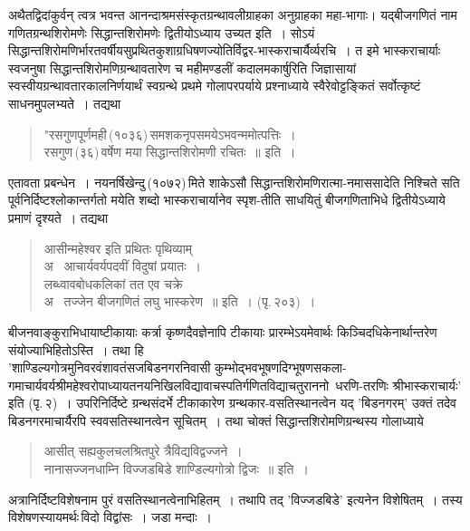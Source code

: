 \documentclass[11pt, openany]{book}
\begin{document}
\begin{sloppypar}
अथैतद्विदांकुर्वन् त्वत्र भवन्त आनन्दाश्रमसंस्कृतग्रन्थावलीग्राहका अनुग्राहका महा-भागाः\;। यद्बीजगणितं नाम गणितग्रन्थशिरोमणेः सिद्धान्तशिरोमणेः द्वितीयोऽध्याय उच्यत इति~। सोऽयं सिद्धान्तशिरोमणिर्भारतवर्षीयसुप्रथितकुशाग्रधिषणज्योतिर्विद्वर-भास्कराचार्यैर्व्यरचि~। त इमे भास्कराचार्याः स्वजनुषा सिद्धान्तशिरोमणिग्रन्थावतारेण च महीमण्डलीं कदालमकार्षुरिति जिज्ञासायां स्वस्वीयग्रन्थावतारकालनिर्णयार्थं स्वग्रन्थे प्रथमे गोलापरपर्याये प्रश्नाध्याये स्वैरेवोट्टङ्कितं सर्वोत्कृष्टं साधनमुपलभ्यते~। तद्यथा\textendash 

\begin{quote}
{\color{violet}"रसगुणपूर्णमही\textendash \,(१०३६)\textendash \,समशकनृपसमयेऽभवन्ममोत्पत्तिः~।\\
रसगुण\textendash \,(३६)\textendash \,वर्षेण मया सिद्धान्तशिरोमणी रचितः~॥} इति~।
\end{quote}

एतावता प्रबन्धेन~। नयनर्षिखेन्दु\textendash \,(१०७२)\textendash \,मिते शाकेऽसौ सिद्धान्तशिरोमणिरात्मा-नमाससादेति निश्चिते सति पूर्वनिर्दिष्टश्लोकान्तर्गतो मयेति शब्दो भास्कराचार्यानेव स्पृश-तीति साधयितुं बीजगणिताभिधे द्वितीयेऽध्याये प्रमाणं दृश्यते~। तद्यथा\textendash 

\begin{quote}
{\color{violet}आसीन्महेश्वर इति प्रथितः पृथिव्याम्\\
{\color{white}अ}~ आचार्यवर्यपदवीं विदुषां प्रयातः~।\\
लब्ध्वावबोधकलिकां तत एव चक्रे\\
{\color{white}अ}~ तज्जेन बीजगणितं लघु भास्करेण~॥} इति~। (पृ.\,२०३)~।
\end{quote}

बीजनवाङ्कुराभिधायाष्टीकायाः कर्त्रा कृष्णदैवज्ञेनापि टीकायाः प्रारम्भेऽयमेवार्थः किञ्चिदधिकेनार्थान्तरेण संयोज्याभिहितोऽस्ति~। तथा हि\textendash \\

{\color{violet}'शाण्डिल्यगोत्रमुनिवरवंशावतंसजबिडनगरनिवासी कुम्भोद्भवभूषणदिग्भूषणसकला-गमाचार्यवर्यश्रीमहेश्वरोपाध्यायतनयनिखिलविद्यावाचस्पतिर्गणितविद्याचतुराननो~धरणि-तरणिः श्रीभास्कराचार्यः'} इति (पृ.\,२)~। उपरिनिर्दिष्टे ग्रन्थसंदर्भे टीकाकारेण ग्रन्थकार-वसतिस्थानत्वेन यद् 'बिडनगरम्' उक्तं तदेव बिडनगरमाचार्यैरपि स्ववसतिस्थानत्वेन सूचितम्~। तथा चोक्तं {\color{violet}सिद्धान्तशिरोमणिग्रन्थस्य गोलाध्याये}\textendash \,

\begin{quote}
{\color{violet}आसीत् सह्यकुलचलश्रितपुरे त्रैविद्यविद्वज्जने~।\\
नानासज्जनधाम्नि विज्जडबिडे शाण्डिल्यगोत्रो द्विजः~॥} इति~।
\end{quote}

अत्रानिर्दिष्टविशेषनाम पुरं वसतिस्थानत्वेनाभिहितम्~। तथापि तद् 'विज्जडबिडे' इत्यनेन विशेषितम्~। तस्य विशेषणस्यायमर्थः\textendash \,विदो विद्वांसः~। जडा मन्दाः~।
\end{sloppypar}
\end{document}
